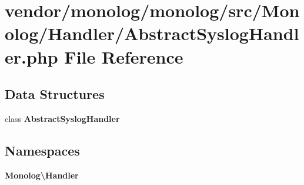 \section{vendor/monolog/monolog/src/\+Monolog/\+Handler/\+Abstract\+Syslog\+Handler.php File Reference}
\label{_abstract_syslog_handler_8php}
\subsection*{Data Structures}
\begin{DoxyCompactItemize}
\item 
class {\bf Abstract\+Syslog\+Handler}
\end{DoxyCompactItemize}
\subsection*{Namespaces}
\begin{DoxyCompactItemize}
\item 
 {\bf Monolog\textbackslash{}\+Handler}
\end{DoxyCompactItemize}

